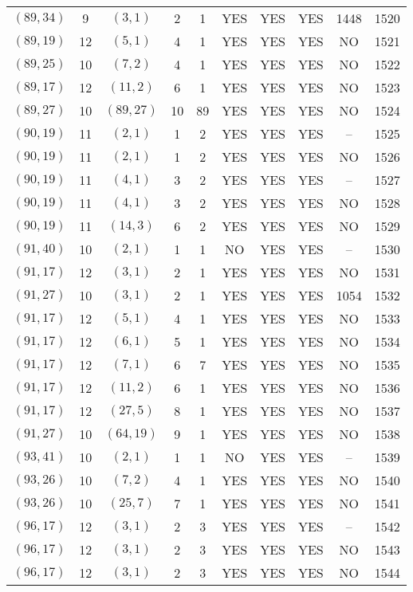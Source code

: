 \begin{longtable}{|c|c|c|c|c|c|c|c|c|c|}
$(89, 34)$ & 9 & $(3, 1)$ & 2 & 1 & YES & YES & YES & 1448 & 1520\\
$(89, 19)$ & 12 & $(5, 1)$ & 4 & 1 & YES & YES & YES & NO & 1521\\
$(89, 25)$ & 10 & $(7, 2)$ & 4 & 1 & YES & YES & YES & NO & 1522\\
$(89, 17)$ & 12 & $(11, 2)$ & 6 & 1 & YES & YES & YES & NO & 1523\\
$(89, 27)$ & 10 & $(89, 27)$ & 10 & 89 & YES & YES & YES & NO & 1524\\
$(90, 19)$ & 11 & $(2, 1)$ & 1 & 2 & YES & YES & YES & -- & 1525\\
$(90, 19)$ & 11 & $(2, 1)$ & 1 & 2 & YES & YES & YES & NO & 1526\\
$(90, 19)$ & 11 & $(4, 1)$ & 3 & 2 & YES & YES & YES & -- & 1527\\
$(90, 19)$ & 11 & $(4, 1)$ & 3 & 2 & YES & YES & YES & NO & 1528\\
$(90, 19)$ & 11 & $(14, 3)$ & 6 & 2 & YES & YES & YES & NO & 1529\\
$(91, 40)$ & 10 & $(2, 1)$ & 1 & 1 & NO & YES & YES & -- & 1530\\
$(91, 17)$ & 12 & $(3, 1)$ & 2 & 1 & YES & YES & YES & NO & 1531\\
$(91, 27)$ & 10 & $(3, 1)$ & 2 & 1 & YES & YES & YES & 1054 & 1532\\
$(91, 17)$ & 12 & $(5, 1)$ & 4 & 1 & YES & YES & YES & NO & 1533\\
$(91, 17)$ & 12 & $(6, 1)$ & 5 & 1 & YES & YES & YES & NO & 1534\\
$(91, 17)$ & 12 & $(7, 1)$ & 6 & 7 & YES & YES & YES & NO & 1535\\
$(91, 17)$ & 12 & $(11, 2)$ & 6 & 1 & YES & YES & YES & NO & 1536\\
$(91, 17)$ & 12 & $(27, 5)$ & 8 & 1 & YES & YES & YES & NO & 1537\\
$(91, 27)$ & 10 & $(64, 19)$ & 9 & 1 & YES & YES & YES & NO & 1538\\
$(93, 41)$ & 10 & $(2, 1)$ & 1 & 1 & NO & YES & YES & -- & 1539\\
$(93, 26)$ & 10 & $(7, 2)$ & 4 & 1 & YES & YES & YES & NO & 1540\\
$(93, 26)$ & 10 & $(25, 7)$ & 7 & 1 & YES & YES & YES & NO & 1541\\
$(96, 17)$ & 12 & $(3, 1)$ & 2 & 3 & YES & YES & YES & -- & 1542\\
$(96, 17)$ & 12 & $(3, 1)$ & 2 & 3 & YES & YES & YES & NO & 1543\\
$(96, 17)$ & 12 & $(3, 1)$ & 2 & 3 & YES & YES & YES & NO & 1544\\

\end{longtable}
